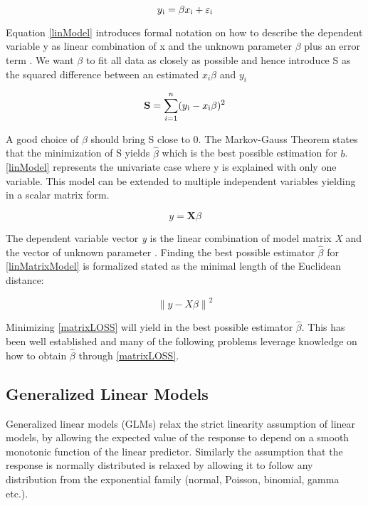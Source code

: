 \documentclass{article}
\begin{document}
    \begin{equation}  \label{linModel} y\textsubscript{i} = \beta x\textsubscript{i} + \varepsilon\textsubscript{i} \end{equation}

    Equation \ref{linModel} introduces formal notation on how to describe the dependent variable y as linear combination of x and the unknown parameter $\beta$ plus an error term \textepsilon. We want $\beta$ to fit all data as closely as possible and hence introduce S as the squared difference between an estimated $x_i \beta$ and $y_i$

    \begin{equation} \label{sumSquares} \mathbf{S} =  \sum_{i=1}^{n}(y\textsubscript{i} - x\textsubscript{i}\beta)^{2} \end{equation}

    A good choice of $\beta$ should bring S close to 0. The  Markov-Gauss Theorem states that the minimization of S yields $\widehat{\beta}$ which is the best possible estimation for $b$. \ref{linModel} represents the univariate case where y is explained with only one variable. This model can be extended to multiple independent variables yielding in a scalar matrix form.

    \begin{equation}  \label{linMatrixModel} y =  \mathbf{X} \beta \end{equation}

     The dependent  variable vector \textit{y} is the linear combination of model matrix \textit{X} and the vector of unknown parameter \textbeta. Finding the best possible estimator $\widehat{\beta}$ for \ref{linMatrixModel} is formalized stated as the minimal length of the Euclidean distance:

    \begin{equation} \label{matrixLOSS} \left \| y - X\beta  \right \|^2 \end{equation}

    Minimizing \ref{matrixLOSS} will yield in the best possible estimator $\widehat{\beta}$. This has been well established and many of the following problems leverage knowledge on how to obtain $\widehat{\beta}$ through \ref{matrixLOSS}.

    \subsection{Generalized Linear Models}
    Generalized linear models (GLMs) relax the strict linearity assumption of linear models, by allowing the expected value of the response to depend on a smooth monotonic function of the linear predictor. Similarly the assumption that the response is normally distributed is relaxed by allowing it to follow any distribution from the exponential family (normal, Poisson, binomial, gamma etc.).
\end{document}
